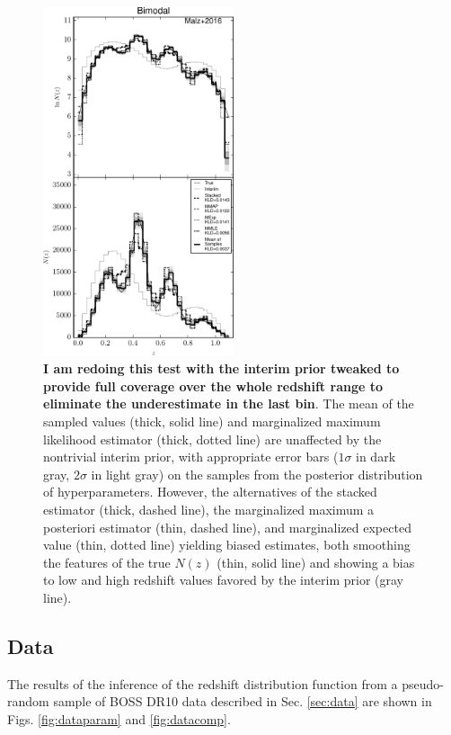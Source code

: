 \documentclass[preprint]{aastex}
\begin{document}
\begin{figure}
\includegraphics[width=0.5\textwidth]{figs/bint/comps.pdf}
\caption{\textbf{I am redoing this test with the interim prior tweaked to 
provide full coverage over the whole redshift range to eliminate the 
underestimate in the last bin}.  The mean of the sampled values (thick, solid 
line) and marginalized maximum likelihood estimator (thick, dotted line) are 
unaffected by the nontrivial interim prior, with appropriate error bars 
($1\sigma$ in dark gray, $2\sigma$ in light gray) on the samples from the 
posterior distribution of hyperparameters.  However, the alternatives of the 
stacked estimator (thick, dashed line), the marginalized maximum a posteriori 
estimator (thin, dashed line), and marginalized expected value (thin, dotted 
line) yielding biased estimates, both smoothing the features of the true $N(z)$ 
(thin, solid line) and showing a bias to low and high redshift values favored 
by the interim prior (gray line).}
\label{fig:intb-comp}
\end{figure}

\subsection{Data}
\label{sec:boss}

The results of the inference of the redshift distribution function from a 
pseudo-random sample of BOSS DR10 data described in Sec. \ref{sec:data} are 
shown in Figs. \ref{fig:dataparam} and \ref{fig:datacomp}.  
\end{document}
